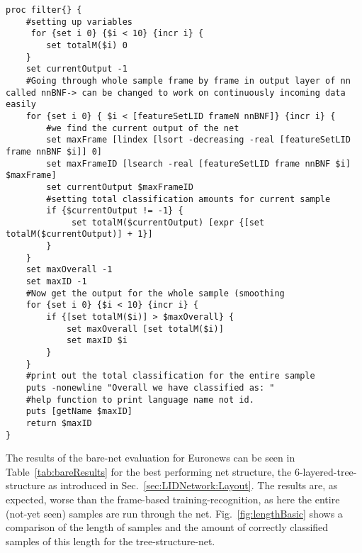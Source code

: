 \begin{lstlisting}[label=lst:basic,caption=Most basic filter employed to smooth output]
proc filter{} {
    #setting up variables
     for {set i 0} {$i < 10} {incr i} {
        set totalM($i) 0
    }
    set currentOutput -1
    #Going through whole sample frame by frame in output layer of nn called nnBNF-> can be changed to work on continuously incoming data easily
    for {set i 0} { $i < [featureSetLID frameN nnBNF]} {incr i} {
        #we find the current output of the net
        set maxFrame [lindex [lsort -decreasing -real [featureSetLID frame nnBNF $i]] 0]
        set maxFrameID [lsearch -real [featureSetLID frame nnBNF $i] $maxFrame]
        set currentOutput $maxFrameID
        #setting total classification amounts for current sample
        if {$currentOutput != -1} {
             set totalM($currentOutput) [expr {[set totalM($currentOutput)] + 1}]
        }
    }
    set maxOverall -1
    set maxID -1
    #Now get the output for the whole sample (smoothing
    for {set i 0} {$i < 10} {incr i} {
        if {[set totalM($i)] > $maxOverall} {
            set maxOverall [set totalM($i)]
            set maxID $i
        }
    }
    #print out the total classification for the entire sample
    puts -nonewline "Overall we have classified as: "
    #help function to print language name not id.
    puts [getName $maxID]
    return $maxID
}
\end{lstlisting}


The results of the bare-net evaluation for Euronews can be seen in Table~\ref{tab:bareResults} for the best performing net structure, the 6-layered-tree-structure as introduced in Sec.~\ref{sec:LIDNetwork:Layout}. The results are, as expected, worse than the frame-based training-recognition, as here the entire (not-yet seen) samples are run through the net.  Fig.~\ref{fig:lengthBasic} shows a comparison of the length of samples and the amount of correctly classified samples of this length for the tree-structure-net.

